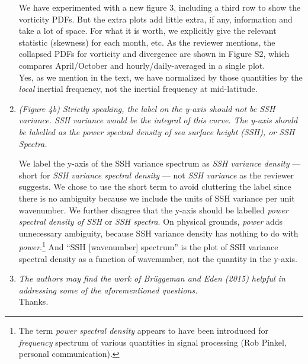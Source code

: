 \documentclass[11pt]{article}
\newcommand{\bdp}{\begin{description}}
\newcommand{\edp}{\end{description}}
\begin{document}
\begin{enumerate}
      \bdp
        We have experimented with a new figure 3, including a third row to show the
        vorticity PDFs. But the extra plots add little extra, if any, information
        and take a lot of space. For what it is worth, we explicitly give the relevant statistic
        (skewness) for each month, etc.  As the reviewer mentions, the collapsed
        PDFs for vorticity and divergence are shown in Figure S2, which compares
        April/October and hourly/daily-averaged in a single plot.\\


        Yes, as we mention in the text, we have normalized by those
        quantities by the \textit{local} inertial frequency, not the inertial
        frequency at mid-latitude.
      \edp

\item {\it (Figure 4b) Strictly speaking, the label on the y-axis should not be SSH variance. SSH
      variance would be the integral of this curve. The y-axis should be labelled as the
      power spectral density of sea surface height (SSH), or SSH Spectra.}\\

      \bdp
      We label the y-axis of the SSH variance spectrum as \textit{SSH variance density}
      --- short for \textit{SSH variance spectral density} --- not \textit{SSH variance} as the reviewer
      suggests.  We chose to use the short term to avoid cluttering the label
      since there is no ambiguity because we include the
      units of SSH variance per unit wavenumber.
      We further disagree that the y-axis should be labelled \textit{power spectral density of SSH}
      or \textit{SSH spectra}. On physical grounds, \textit{power} adds
      unnecessary ambiguity,
      because SSH variance density has nothing to do with \textit{power}.\footnote{The
      term \textit{power spectral density}  appears to have been introduced
      for \textit{frequency} spectrum of various quantities in signal processing (Rob Pinkel, personal
      communication).}
      And ``SSH [wavenumber] spectrum'' is the plot of SSH variance spectral density
      as a function of wavenumber, not the quantity in the y-axis.
      \edp



\item {\it The authors may find the work of Brüggeman and Eden (2015) helpful in addressing
      some of the aforementioned questions.}\\

      Thanks.


\end{enumerate}


\end{document}
